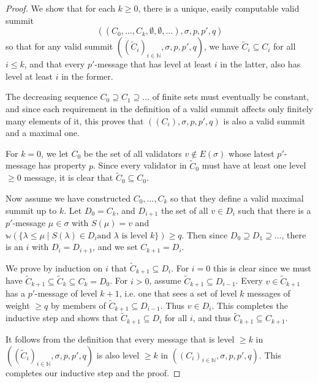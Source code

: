 \documentclass[12pt]{article}
\begin{document}
\begin{proof}
  We show that for each $k \geq 0$, there is a unique, easily computable valid summit
  $$((C_0, \ldots, C_k, \emptyset, \emptyset, \ldots), \sigma, p, p', q)$$
  so that for any valid summit $((\tilde{C}_i)_{i \in \mathbb{N}}, \sigma, p, p', q)$, we have $\tilde{C}_i \subseteq C_i$ for all $i \leq k$, and that every $p'$-message that has level at least $i$ in the latter, also has level at least $i$ in the former.

  The decreasing sequence $C_0 \supseteq C_1 \supseteq \ldots$ of finite sets must eventually be constant, and since each requirement in the definition of a valid summit affects only finitely many elements of it, this proves that $((C_i), \sigma, p, p', q)$ is also a valid summit and a maximal one.

  For $k = 0$, we let $C_0$ be the set of all validators $v \notin E(\sigma)$ whose latest $p'$-message has property $p$. Since every validator in $\tilde{C}_0$ must have at least one level $\geq 0$ message, it is clear that $\tilde{C}_0 \subseteq C_0$.

  Now assume we have constructed $C_0, \ldots, C_k$ so that they define a valid maximal summit up to $k$. Let $D_0 = C_k$, and $D_{i + 1}$ the set of all $v \in D_i$ such that there is a $p'$-message $\mu \in \sigma$ with $S(\mu) = v$ and $\mathbb{w}(\{\lambda \leq \mu \mid S(\lambda) \in D_i \text{and $\lambda$ is level $k$}\}) \geq q$. Then since $D_0 \supseteq D_1 \supseteq \ldots$, there is an $i$ with $D_i = D_{i+1}$, and we set $C_{k + 1} = D_i$.

  We prove by induction on $i$ that $\tilde{C}_{k + 1} \subseteq D_i$. For $i = 0$ this is clear since we must have $\tilde{C}_{k + 1} \subseteq \tilde{C}_k \subseteq C_k = D_0$. For $i > 0$, assume $\tilde{C}_{k + 1} \subseteq D_{i - 1}$. Every $v \in \tilde{C}_{k + 1}$ has a $p'$-message of level $k + 1$, i.e. one that sees a set of level $k$ messages of weight $\geq q$ by members of $\tilde{C}_{k + 1} \subseteq D_{i - 1}$. Thus $v \in D_i$. This completes the inductive step and shows that $\tilde{C}_{k + 1} \subseteq D_i$ for all $i$, and thus $\tilde{C}_{k + 1} \subseteq C_{k + 1}$.

  It follows from the definition that every message that is level $\geq k$ in $((\tilde{C}_i)_{i \in \mathbb{N}}, \sigma, p, p', q)$ is also level $\geq k$ in $((C_i)_{i \in \mathbb{N}}, \sigma, p, p', q)$. This completes our inductive step and the proof.
\end{proof}
\end{document}
